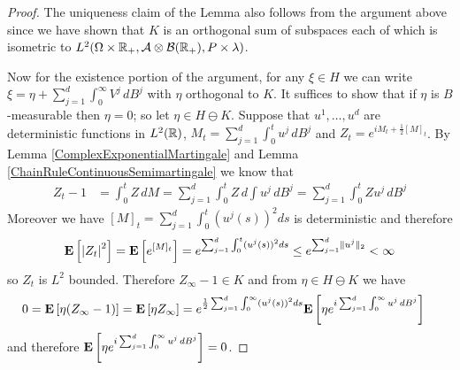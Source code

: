 \begin{proof}
The uniqueness claim of the Lemma also follows from the argument above since we have shown that $K$ is an orthogonal sum of subspaces each of which is isometric to $L^2(\Omega \times \mathbb{R}_+, \mathcal{A} \otimes \mathcal{B}(\mathbb{R}_+), P \times \lambda)$.

Now for the existence portion of the argument, for any $\xi \in H$ we can write $\xi = \eta + \sum_{j=1}^d \int_0^\infty V^j \, dB^j$ with $\eta$ orthogonal to $K$.  It suffices to show that if $\eta$ is $B$-measurable then $\eta = 0$; so let $\eta \in H \ominus K$.  Suppose that $u^1, \dotsc, u^d$ are deterministic functions in $L^2(\mathbb{R})$, $M_t = \sum_{j=1}^d \int_0^t u^j \, dB^j$ and $Z_t = e^{iM_t + \frac{1}{2}[M]_t}$.  By Lemma \ref{ComplexExponentialMartingale} and Lemma \ref{ChainRuleContinuousSemimartingale} we know that 
\begin{align*}
Z_t - 1 &= \int_0^t Z \, dM = \sum_{j=1}^d \int_0^t Z \, d\int u^j \, dB^j = \sum_{j=1}^d \int_0^t Z u^j \, dB^j 
\end{align*} 
Moreover we have $[M]_t = \sum_{j=1}^d \int_0^t (u^j(s))^2 ds$ is deterministic and therefore 
\begin{align*}
\textbf{E}\left[\left \vert Z_t \right \vert^2\right] = \textbf{E}\left[e^{[M]_t}\right] = e^{\sum_{j=1}^d \int_0^t (u^j(s))^2 ds} \leq e^{\sum_{j=1}^d \lVert u^j \rVert_2} < \infty
\end{align*}
so $Z_t$ is $L^2$ bounded.  Therefore $Z_\infty - 1 \in K$ and from $\eta \in H \ominus K$ we have 
\begin{align*}
0 &= \textbf{E}\left[\eta (Z_\infty - 1)\right] = \textbf{E}\left[\eta Z_\infty\right] = e^{\frac{1}{2} \sum_{j=1}^d \int_0^\infty (u^j(s))^2 ds} \textbf{E}\left[\eta e^{i\sum_{j=1}^d \int_0^\infty u^j \, dB^j}\right]
\end{align*}
and therefore $\textbf{E}\left[\eta e^{i\sum_{j=1}^d \int_0^\infty u^j \, dB^j}\right] = 0$.


\end{proof}
